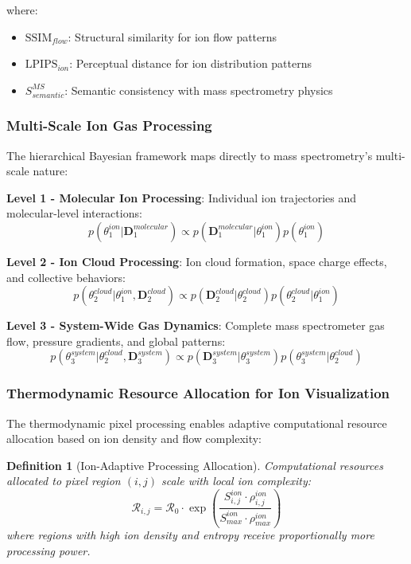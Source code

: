 \documentclass[11pt,a4paper]{article}
\newtheorem{definition}[theorem]{Definition}
\theoremstyle{remark}
\begin{document}
where:
\begin{itemize}
\item $\text{SSIM}_{flow}$: Structural similarity for ion flow patterns
\item $\text{LPIPS}_{ion}$: Perceptual distance for ion distribution patterns  
\item $S_{semantic}^{MS}$: Semantic consistency with mass spectrometry physics
\end{itemize}

\subsubsection{Multi-Scale Ion Gas Processing}

The hierarchical Bayesian framework maps directly to mass spectrometry's multi-scale nature:

\textbf{Level 1 - Molecular Ion Processing}:
Individual ion trajectories and molecular-level interactions:
$$p(\theta_1^{ion}|\mathbf{D}_1^{molecular}) \propto p(\mathbf{D}_1^{molecular}|\theta_1^{ion})p(\theta_1^{ion})$$

\textbf{Level 2 - Ion Cloud Processing}:  
Ion cloud formation, space charge effects, and collective behaviors:
$$p(\theta_2^{cloud}|\theta_1^{ion}, \mathbf{D}_2^{cloud}) \propto p(\mathbf{D}_2^{cloud}|\theta_2^{cloud})p(\theta_2^{cloud}|\theta_1^{ion})$$

\textbf{Level 3 - System-Wide Gas Dynamics}:
Complete mass spectrometer gas flow, pressure gradients, and global patterns:
$$p(\theta_3^{system}|\theta_2^{cloud}, \mathbf{D}_3^{system}) \propto p(\mathbf{D}_3^{system}|\theta_3^{system})p(\theta_3^{system}|\theta_2^{cloud})$$

\subsubsection{Thermodynamic Resource Allocation for Ion Visualization}

The thermodynamic pixel processing enables adaptive computational resource allocation based on ion density and flow complexity:

\begin{definition}[Ion-Adaptive Processing Allocation]
Computational resources allocated to pixel region $(i,j)$ scale with local ion complexity:
$$\mathcal{R}_{i,j} = \mathcal{R}_0 \cdot \exp\left(\frac{S_{i,j}^{ion} \cdot \rho_{i,j}^{ion}}{S_{max}^{ion} \cdot \rho_{max}^{ion}}\right)$$
where regions with high ion density and entropy receive proportionally more processing power.
\end{definition}
\end{document}
